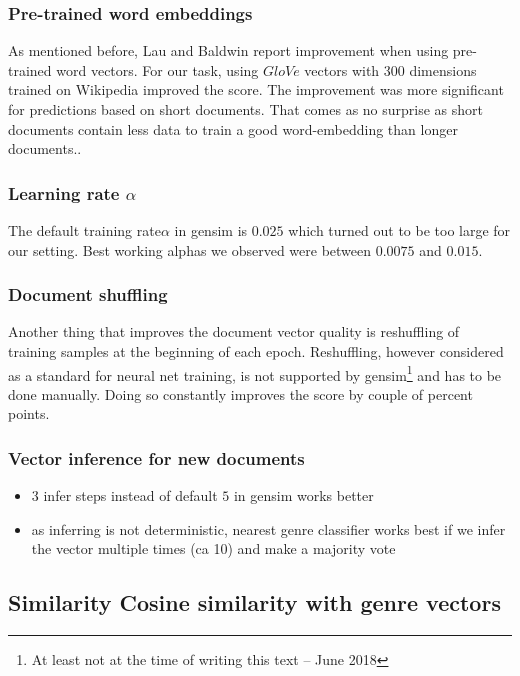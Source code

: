 \subsubsection{Pre-trained word embeddings}
As mentioned before, Lau and Baldwin\cite{doc2vec_params} report improvement when using pre-trained word vectors. For our task, using $GloVe$ vectors with $300$ dimensions trained on Wikipedia improved the score. The improvement was more significant for predictions based on short documents. That comes as no surprise as short documents contain less data to train a good word-embedding than longer documents..

\subsubsection{Learning rate $\alpha$}
The default training rate$ \alpha$ in gensim is $0.025$ which turned out to be too large for our setting. Best working alphas we observed were between $0.0075$ and $0.015$.

\subsubsection{Document shuffling}
Another thing that improves the document vector quality is reshuffling of training samples at the beginning of each epoch. Reshuffling, however considered as a standard for neural net training, is not supported by gensim\footnote{At least not at the time of writing this text -- June 2018} and has to be done manually. Doing so constantly improves the score by couple of percent points.

\subsubsection{Vector inference for new documents}
\begin{itemize}
	\item $3$ infer steps instead of default $5$ in gensim works better
	\item as inferring is not deterministic, nearest genre classifier works best if we infer the vector multiple times (ca 10) and make a majority vote
\end{itemize}

\subsection{Similarity Cosine similarity with genre vectors}

